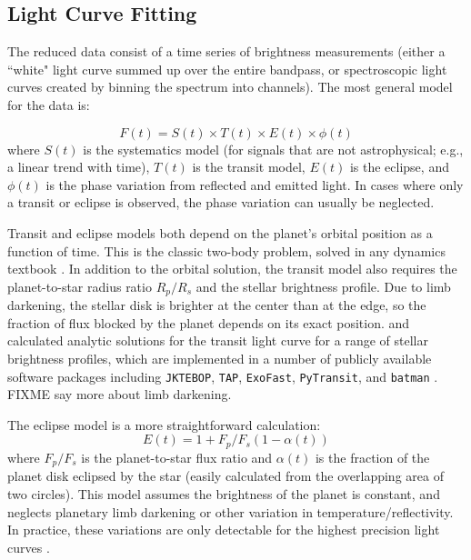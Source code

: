 \documentclass[graybox,natbib,nosecnum]{svmult}
\begin{document}
\subsection{Light Curve Fitting}
The reduced data consist of a time series of brightness measurements (either a ``white" light curve summed up over the entire bandpass, or spectroscopic light curves created by binning the spectrum into channels).  The most general model for the data is:

\begin{equation}
F(t) = S(t) \times T(t) \times E(t) \times \phi(t)
\end{equation}
where $S(t)$ is the systematics model (for signals that are not astrophysical; e.g., a linear trend with time), $T(t)$ is the transit model, $E(t)$ is the eclipse, and $\phi(t)$ is the phase variation from reflected and emitted light. In cases where only a transit or eclipse is observed, the phase variation can usually be neglected.

Transit and eclipse models both depend on the planet's orbital position as a function of time. This is the classic two-body problem, solved in any dynamics textbook \citep[e.g.][]{murray99}. In addition to the orbital solution, the transit model also requires the planet-to-star radius ratio $R_p/R_s$ and the stellar brightness profile. Due to limb darkening, the stellar disk is brighter at the center than at the edge, so the fraction of flux blocked by the planet depends on its exact position.  \cite{mandel02} and \cite{gimenez06} calculated analytic solutions for the transit light curve for a range of stellar brightness profiles,  which are implemented in a number of publicly available software packages including \texttt{JKTEBOP}, \texttt{TAP}, \texttt{ExoFast}, \texttt{PyTransit}, and \texttt{batman} \citep{southworth04, gazak12, eastman13, parviainen15, kreidberg15a}.  FIXME say more about limb darkening.

The eclipse model is a more straightforward calculation: 
\begin{equation}
E(t) = 1 + F_p/F_s (1 - \alpha(t)) 
\end{equation}
where $F_p/F_s$ is the planet-to-star flux ratio and $\alpha(t)$ is the fraction of the planet disk eclipsed by the star (easily calculated from the overlapping area of two circles). This model assumes the brightness of the planet is constant, and neglects planetary limb darkening or other variation in temperature/reflectivity. In practice, these variations are only detectable for the highest precision light curves \citep{FIXME}. 
\end{document}
